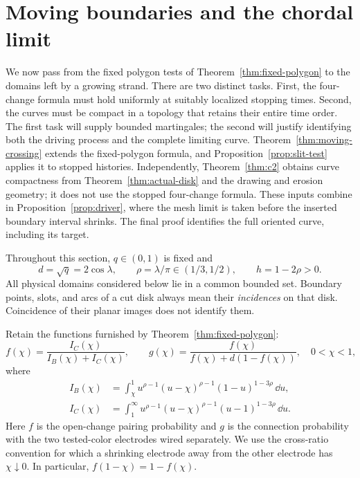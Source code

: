 \section{Moving boundaries and the chordal limit}\label{sec:moving}

We now pass from the fixed polygon tests of
Theorem~\ref{thm:fixed-polygon} to the domains left by a growing strand.
There are two distinct tasks.  First, the four-change formula must hold
uniformly at suitably localized stopping times.  Second, the curves
must be compact in a topology that retains their entire time order.
The first task will supply bounded martingales; the second will justify
identifying both the driving process and the complete limiting curve.
Theorem~\ref{thm:moving-crossing} extends the fixed-polygon formula,
and Proposition~\ref{prop:slit-test} applies it to stopped histories.
Independently, Theorem~\ref{thm:c2} obtains curve compactness from
Theorem~\ref{thm:actual-disk} and the drawing and erosion geometry;
it does not use the stopped four-change formula.
These inputs combine in Proposition~\ref{prop:driver}, where the
mesh limit is taken before the inserted boundary interval shrinks.
The final proof identifies the full oriented curve, including its target.

Throughout this section, $q\in(0,1)$ is fixed and
\[
 d=\sqrt q=2\cos\lambda,\qquad
 \rho=\lambda/\pi\in(1/3,1/2),\qquad h=1-2\rho>0.
\]
All physical domains considered below lie in a common bounded set.
Boundary points, slots, and arcs of a cut disk always mean their
\emph{incidences} on that disk.  Coincidence of their planar images
does not identify them.

Retain the functions furnished by Theorem~\ref{thm:fixed-polygon}:
\begin{equation}\label{chordal:functions}
 f(\chi)=\frac{I_C(\chi)}{I_B(\chi)+I_C(\chi)},\qquad
 g(\chi)=\frac{f(\chi)}{f(\chi)+d(1-f(\chi))},
 \quad 0<\chi<1,
\end{equation}
where
\begin{align*}
 I_B(\chi)&=\int_\chi^1
 u^{\rho-1}(u-\chi)^{\rho-1}(1-u)^{1-3\rho}\,\dd u,\\
 I_C(\chi)&=\int_1^\infty
 u^{\rho-1}(u-\chi)^{\rho-1}(u-1)^{1-3\rho}\,\dd u.
\end{align*}
Here $f$ is the open-change pairing probability and $g$ is the
connection probability with the two tested-color electrodes wired
separately.  We use the cross-ratio convention for which a shrinking
electrode away from the other electrode has $\chi\downarrow0$.
In particular, $f(1-\chi)=1-f(\chi)$.

